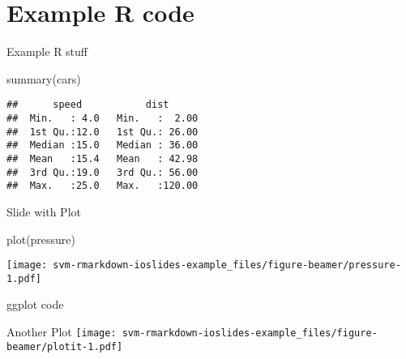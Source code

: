 \documentclass[
  10pt,
  ignorenonframetext,
]{beamer}
\newenvironment{Shaded}{\begin{snugshade}}{\end{snugshade}}
\newcommand{\AttributeTok}[1]{\textcolor[rgb]{0.77,0.63,0.00}{#1}}
\newcommand{\DecValTok}[1]{\textcolor[rgb]{0.00,0.00,0.81}{#1}}
\newcommand{\FunctionTok}[1]{\textcolor[rgb]{0.00,0.00,0.00}{#1}}
\newcommand{\NormalTok}[1]{#1}
\newcommand{\OtherTok}[1]{\textcolor[rgb]{0.56,0.35,0.01}{#1}}
\newcommand{\SpecialCharTok}[1]{\textcolor[rgb]{0.00,0.00,0.00}{#1}}
\newcommand{\StringTok}[1]{\textcolor[rgb]{0.31,0.60,0.02}{#1}}
\begin{document}
\hypertarget{example-r-code}{%
\section{Example R code}\label{example-r-code}}

\begin{frame}[fragile]{Example R stuff}
\protect\hypertarget{example-r-stuff}{}
\begin{Shaded}
\begin{Highlighting}[]
\FunctionTok{summary}\NormalTok{(cars)}
\end{Highlighting}
\end{Shaded}

\begin{verbatim}
##      speed           dist       
##  Min.   : 4.0   Min.   :  2.00  
##  1st Qu.:12.0   1st Qu.: 26.00  
##  Median :15.0   Median : 36.00  
##  Mean   :15.4   Mean   : 42.98  
##  3rd Qu.:19.0   3rd Qu.: 56.00  
##  Max.   :25.0   Max.   :120.00
\end{verbatim}
\end{frame}

\begin{frame}[fragile]{Slide with Plot}
\protect\hypertarget{slide-with-plot}{}
\begin{Shaded}
\begin{Highlighting}[]
\FunctionTok{plot}\NormalTok{(pressure)}
\end{Highlighting}
\end{Shaded}

\texttt{[image: svm-rmarkdown-ioslides-example\_files/figure-beamer/pressure-1.pdf]}
\end{frame}

\begin{frame}[fragile]{ggplot code}
\protect\hypertarget{ggplot-code}{}
\begin{Shaded}
\end{Shaded}
\end{frame}

\begin{frame}{Another Plot}
\protect\hypertarget{another-plot}{}
\texttt{[image: svm-rmarkdown-ioslides-example\_files/figure-beamer/plotit-1.pdf]}
\end{frame}
\end{document}
